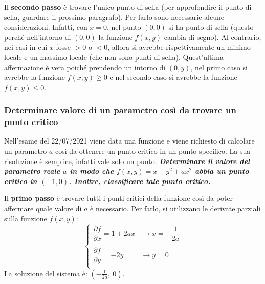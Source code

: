 \documentclass[a4paper]{article}
\begin{document}
	\noindent
	Il \textbf{secondo passo} è trovare l'unico punto di sella (per approfondire il punto di sella, guardare il prossimo paragrafo). Per farlo sono necessarie alcune considerazioni. Infatti, con $x = 0$, nel punto $\left(0,0\right)$ si ha punto di sella (questo perché nell'intorno di $\left(0,0\right)$ la funzione $f\left(x,y\right)$ cambia di segno). Al contrario, nei casi in cui $x$ fosse $> 0$ o $< 0$, allora si  avrebbe rispettivamente un minimo locale e un massimo locale (che non sono punti di sella). Quest'ultima affermazione è vera poiché prendendo un intorno di $\left(0,y\right)$, nel primo caso si avrebbe la funzione $f\left(x,y\right) \ge 0$ e nel secondo caso si avrebbe la funzione $f\left(x,y\right) \le 0$.\newpage

	\subsubsection{Determinare valore di un parametro così da trovare un punto critico}\label{par: determinare valore di un parametro così da trovare un punto critico}

	Nell'esame del 22/07/2021 viene data una funzione e viene richiesto di calcolare un parametro $a$ così da ottenere un punto critico in un punto specifico. La sua risoluzione è semplice, infatti vale solo un punto.\newline
	\textcolor{Green4}{\textbf{\emph{Determinare il valore del parametro reale $a$ in modo che $f\left(x,y\right) = x - y^{2} + ax^{2}$ abbia un punto critico in $\left(-1, 0\right)$. Inoltre, classificare tale punto critico.}}}\newline

	\noindent
	Il \textbf{primo passo} è trovare tutti i punti critici della funzione così da poter affermare quale valore di $a$ è necessario. Per farlo, si utilizzano le derivate parziali sulla funzione $f\left(x,y\right)$:
	\begin{equation*}
		\begin{cases}
			\dfrac{\partial f}{\partial x} = 1 + 2ax	& \rightarrow x = -\dfrac{1}{2a} \\
			\\
			\dfrac{\partial f}{\partial y} = -2y		& \rightarrow y = 0 \\
		\end{cases}
	\end{equation*}
	La soluzione del sistema è: $\left(-\frac{1}{2a}, \: 0\right)$.\newline
\end{document}

